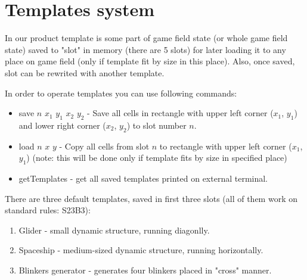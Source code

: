 \chapter*{Templates system}

In our product template is some part of game field state (or whole game field state) saved to "slot" in memory (there are 5 slots) for later loading it to any place on game field (only if template fit by size in this place). Also, once saved, slot can be rewrited with another template.

In order to operate templates you can use following commands:

\begin{itemize}
	\item \textsf{save $n$ $x_{1}$ $y_{1}$ $x_{2}$ $y_{2}$} - Save all cells in rectangle with upper left corner ($x_{1}$, $y_{1}$) and lower right corner ($x_{2}$, $y_{2}$) to slot number $n$.
	\item \textsf{load $n$ $x$ $y$} - Copy all cells from slot $n$ to rectangle with upper left corner ($x_{1}$, $y_{1}$) (note: this will be done only if template fits by size in specified place)
	\item \textsf{getTemplates} - get all saved templates printed on external terminal.
\end{itemize}

There are three default templates, saved in first three slots (all of them work on standard rules: S23B3):

\begin{enumerate}
	\item Glider - small dynamic structure, running diagonlly.
	\item Spaceship - medium-sized dynamic structure, running horizontally.
	\item Blinkers generator - generates four blinkers placed in "cross" manner.
\end{enumerate}
